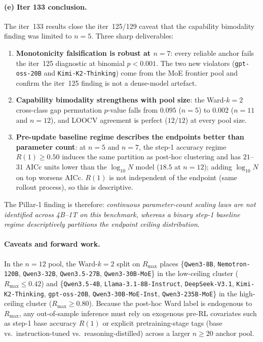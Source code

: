 \paragraph{(e) Iter 133 conclusion.}
\label{par:scaling-iter133-conclusion}
The iter~133 results close the iter~125/129 caveat that the
capability bimodality finding was limited to $n = 5$.  Three
sharp deliverables:

\begin{enumerate}
  \item \textbf{Monotonicity falsification is robust at
    $n = 7$}: every reliable anchor fails the iter~125
    diagnostic at binomial $p < 0.001$.  The two new violators
    (\texttt{gpt-oss-20B} and \texttt{Kimi-K2-Thinking}) come from the MoE
    frontier pool and confirm the iter~125 finding is not
    a dense-model artefact.
  \item \textbf{Capability bimodality strengthens with pool
    size}: the Ward-$k=2$ cross-class gap permutation
    $p$-value falls from $0.095$ ($n = 5$) to $0.002$
    ($n = 11$ and $n = 12$), and LOOCV agreement is perfect ($12/12$) at
    every pool size.
  \item \textbf{Pre-update baseline regime describes the endpoints
    better than parameter count}: at $n=5$ and $n=7$, the step-1
    accuracy regime $R(1) \ge 0.50$ induces the same partition as
    post-hoc clustering and has $21$--$31$ AICc units lower than the
    $\log_{10} N$ model ($18.5$ at $n=12$); adding $\log_{10} N$ on top
    worsens AICc.  $R(1)$ is not independent of the endpoint (same
    rollout process), so this is descriptive.
\end{enumerate}

The Pillar-1 finding is therefore: \emph{continuous parameter-count
scaling laws are not identified across 4B--1T on this benchmark,
whereas a binary step-1 baseline regime descriptively partitions the
endpoint ceiling distribution}.

\paragraph{Caveats and forward work.}
\label{par:scaling-iter133-caveats}
In the $n=12$ pool, the Ward-$k=2$ split on $R_{\max}$ places
\{\texttt{Qwen3-8B}, \texttt{Nemotron-120B}, \texttt{Qwen3-32B},
\texttt{Qwen3.5-27B}, \texttt{Qwen3-30B-MoE}\} in the low-ceiling
cluster ($R_{\max} \le 0.42$) and \{\texttt{Qwen3.5-4B},
\texttt{Llama-3.1-8B-Instruct}, \texttt{DeepSeek-V3.1},
\texttt{Kimi-K2-Thinking}, \texttt{gpt-oss-20B},
\texttt{Qwen3-30B-MoE-Inst}, \texttt{Qwen3-235B-MoE}\} in the
high-ceiling cluster ($R_{\max} \ge 0.80$).  Because the post-hoc
Ward label is endogenous to $R_{\max}$, any out-of-sample inference
must rely on exogenous pre-RL covariates such as step-1 base accuracy
$R(1)$ or explicit pretraining-stage tags (base vs.\ instruction-tuned
vs.\ reasoning-distilled) across a larger $n \ge 20$ anchor pool.

